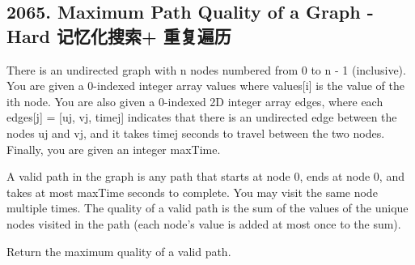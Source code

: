 \documentclass[9pt, b5paaper]{book}
\begin{document}
\subsection{2065. Maximum Path Quality of a Graph - Hard 记忆化搜索+ 重复遍历}
\label{sec-1-0-3}
There is an undirected graph with n nodes numbered from 0 to n - 1 (inclusive). You are given a 0-indexed integer array values where values[i] is the value of the ith node. You are also given a 0-indexed 2D integer array edges, where each edges[j] = [uj, vj, timej] indicates that there is an undirected edge between the nodes uj and vj, and it takes timej seconds to travel between the two nodes. Finally, you are given an integer maxTime.

A valid path in the graph is any path that starts at node 0, ends at node 0, and takes at most maxTime seconds to complete. You may visit the same node multiple times. The quality of a valid path is the sum of the values of the unique nodes visited in the path (each node's value is added at most once to the sum).

Return the maximum quality of a valid path.
\end{document}
